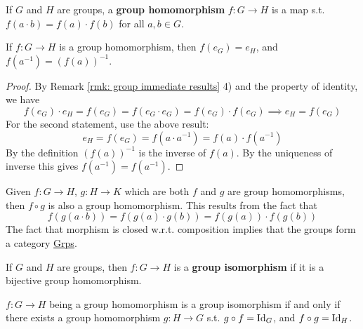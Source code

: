 \begin{definition}
    If $G$ and $H$ are groups, a \textbf{group homomorphism} $f: G \to H$ is a map s.t. $f(a\cdot b) = f(a) \cdot f(b)$ for all $a, b \in G$. 
\end{definition}

\begin{proposition}\label{prop: grp homo preserve identity and inverse}
    If $f: G \to H$ is a group homomorphism, then $f(e_G) = e_H$, and $f(a^{-1}) = (f(a))^{-1}$.
\end{proposition}

\begin{proof}
    By Remark \ref{rmk: group immediate results} 4) and the property of identity, we have
    \[
        f(e_G) \cdot e_H = f(e_G) = f(e_G \cdot e_G) = f(e_G) \cdot f(e_G) \implies e_H = f(e_G)
    \]
    For the second statement, use the above result:
    \[
        e_H = f(e_G) = f(a \cdot a^{-1}) = f(a) \cdot f(a^{-1})
    \]
    By the definition $(f(a))^{-1}$ is the inverse of $f(a)$. By the uniqueness of inverse this gives $f(a^{-1}) = f(a^{-1})$.
\end{proof}

\begin{remark}
    Given $f: G \to H$, $g: H \to K$ which are both $f$ and $g$ are group homomorphisms, then $f \circ g$ is also a group homomorphism. This results from the fact that
    \[
        f(g(a \cdot b)) = f(g(a) \cdot g(b)) = f(g(a)) \cdot f(g(b))
    \]
    The fact that morphism is closed w.r.t. composition implies that the groups form a category \underline{Grps}.
\end{remark}

\begin{definition}
    If $G$ and $H$ are groups, then $f: G \to H$ is a \textbf{group isomorphism} if it is a bijective group homomorphism.
\end{definition}

\begin{proposition}\label{prop: categorical def of group isomorphism}
    $f: G \to H$ being a group homomorphism is a group isomorphism if and only if there exists a group homomorphism $g: H \to G$ s.t. $g \circ f = \mathrm{Id}_G$, and $f \circ g = \mathrm{Id}_H$.
\end{proposition}

